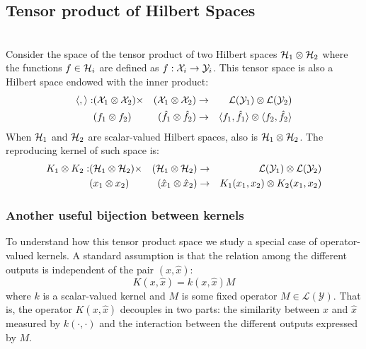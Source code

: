 \subsection{Tensor product of Hilbert Spaces}
\\
Consider the space of the tensor product of two Hilbert spaces $\mathcal{H}_1 \otimes \mathcal{H}_2$ where the functions $f \in \mathcal{H}_i$ are defined as $f: \mathcal{X}_i \to \mathcal{Y}_i$. This tensor space is also a Hilbert space endowed with the inner product:
\begin{equation}
    \nonumber
    \begin{aligned}
        \langle ,  \rangle: &(\mathcal{X}_1 \otimes \mathcal{X}_2) \times &(\mathcal{X}_1 \otimes \mathcal{X}_2) &\to & \mathcal{L}(\mathcal{Y}_1) \otimes \mathcal{L}(\mathcal{Y}_2) \\
    &(f_1 \otimes f_2) &(\hat{f}_1 \otimes \hat{f}_2) &\to &\langle f_1, \hat{f}_1 \rangle \otimes \langle f_2, \hat{f}_2 \rangle
    \end{aligned}
\end{equation}
When $\mathcal{H}_1$ and $\mathcal{H}_2$ are scalar-valued Hilbert spaces, also is $\mathcal{H}_1 \otimes \mathcal{H}_2$.
The reproducing kernel of such space is:
\begin{equation}
    \nonumber
    \begin{aligned}
        K_1 \otimes K_2: &(\mathcal{H}_1 \otimes \mathcal{H}_2) \times &(\mathcal{H}_1 \otimes \mathcal{H}_2) &\to & \mathcal{L}(\mathcal{Y}_1) \otimes \mathcal{L}(\mathcal{Y}_2) \\
    &(x_1 \otimes x_2) &(\hat{x}_1 \otimes \hat{x}_2) &\to & K_1(x_1, x_2) \otimes K_2(x_1, x_2)
    \end{aligned}
\end{equation}

\subsubsection*{Another useful bijection between kernels}
To understand how this tensor product space we study a special case of operator-valued kernels.
A standard assumption is that the relation among the different outputs is independent of the pair $(x, \hat{x})$:
$$ K(x, \hat{x})  = k(x, \hat{x}) M$$
where $k$ is a scalar-valued kernel and $M$ is some fixed operator $M \in \mathcal{L}(\mathcal{Y})$. That is, the operator $K(x, \hat{x})$ decouples in two parts: the similarity between $x$ and $\hat{x}$ measured by $k(\cdot,\cdot)$ and the interaction between the different outputs expressed by $M$.

